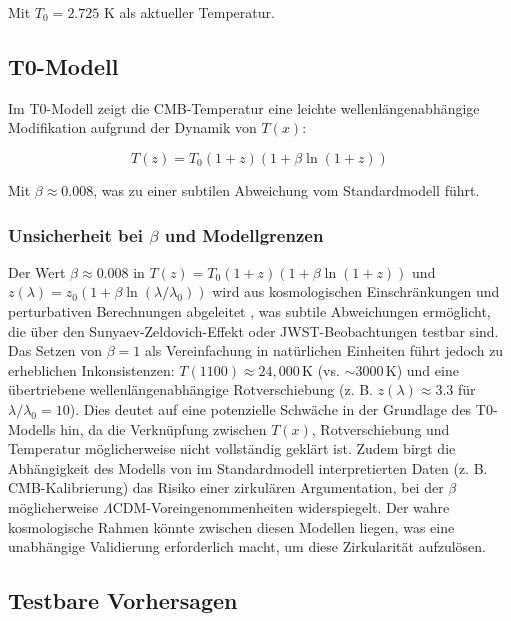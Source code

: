\documentclass[a4paper,12pt]{article}
\theoremstyle{definition}
\theoremstyle{remark}
\newcommand{\Tfield}{T(x)}
\begin{document}
	Mit $T_0 = 2.725$ K als aktueller Temperatur.
	
	\subsection{T0-Modell}
	
	Im T0-Modell zeigt die CMB-Temperatur eine leichte wellenlängenabhängige Modifikation aufgrund der Dynamik von \( \Tfield \):
	
	\begin{equation}
		T(z) = T_0 (1 + z) (1 + \beta \ln(1 + z))
	\end{equation}
	
	Mit \(\beta \approx 0.008\), was zu einer subtilen Abweichung vom Standardmodell führt.
	
	\subsubsection{Unsicherheit bei \(\beta\) und Modellgrenzen}
	
	Der Wert \(\beta \approx 0.008\) in \( T(z) = T_0 (1 + z) (1 + \beta \ln(1 + z)) \) und \( z(\lambda) = z_0 (1 + \beta \ln(\lambda/\lambda_0)) \) wird aus kosmologischen Einschränkungen und perturbativen Berechnungen abgeleitet \cite{pascher_params_2025}, was subtile Abweichungen ermöglicht, die über den Sunyaev-Zeldovich-Effekt oder JWST-Beobachtungen testbar sind. Das Setzen von \(\beta = 1\) als Vereinfachung in natürlichen Einheiten \cite{pascher_temp_2025} führt jedoch zu erheblichen Inkonsistenzen: \( T(1100) \approx 24,000 \, \text{K} \) (vs. \(\sim 3000 \, \text{K}\)) und eine übertriebene wellenlängenabhängige Rotverschiebung (z. B. \( z(\lambda) \approx 3.3 \) für \(\lambda/\lambda_0 = 10\)). Dies deutet auf eine potenzielle Schwäche in der Grundlage des T0-Modells hin, da die Verknüpfung zwischen \(\Tfield\), Rotverschiebung und Temperatur möglicherweise nicht vollständig geklärt ist. Zudem birgt die Abhängigkeit des Modells von im Standardmodell interpretierten Daten (z. B. CMB-Kalibrierung) das Risiko einer zirkulären Argumentation, bei der \(\beta\) möglicherweise \(\Lambda\)CDM-Voreingenommenheiten widerspiegelt. Der wahre kosmologische Rahmen könnte zwischen diesen Modellen liegen, was eine unabhängige Validierung erforderlich macht, um diese Zirkularität aufzulösen.
	
	\subsection{Testbare Vorhersagen}
	
\end{document}
